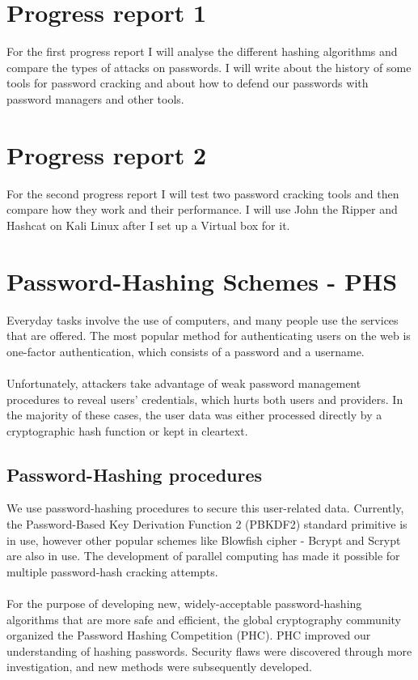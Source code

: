 \documentclass[10pt,oneside,english,a4paper]{article}
\begin{document}
\section{Progress report 1}
For the first progress report I will analyse the different hashing algorithms and compare the types of attacks on passwords. I will write about the history of some tools for password cracking and about how to defend our passwords with password managers and other tools. 

\section{Progress report 2}
For the second progress report I will test two password cracking tools and then compare how they work and their performance. I will use John the Ripper and Hashcat on Kali Linux after I set up a Virtual box for it.

\clearpage


\section{Password-Hashing Schemes - PHS}
Everyday tasks involve the use of computers, and many people use the services that are offered. The most popular method for authenticating users on the web is one-factor authentication, which consists of a password and a username.
\\\\
Unfortunately, attackers take advantage of weak password management procedures to reveal users' credentials, which hurts both users and providers.
In the majority of these cases, the user data was either processed directly by a cryptographic hash function or kept in cleartext.

\subsection{Password-Hashing procedures}
We use password-hashing procedures to secure this user-related data.
Currently, the Password-Based Key Derivation Function 2 (PBKDF2) standard primitive is in use, however other popular schemes like Blowfish cipher - Bcrypt and Scrypt are also in use.
The development of parallel computing has made it possible for multiple password-hash cracking attempts.
\\\\
For the purpose of developing new, widely-acceptable password-hashing algorithms that are more safe and efficient, the global cryptography community organized the Password Hashing Competition (PHC). PHC improved our understanding of hashing passwords. Security flaws were discovered through more investigation, and new methods were subsequently developed.
\end{document}

